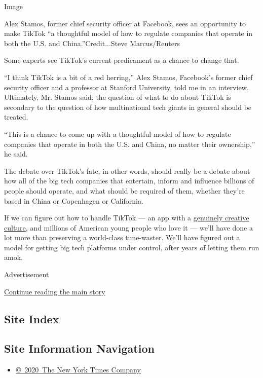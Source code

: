 Image

Alex Stamos, former chief security officer at Facebook, sees an
opportunity to make TikTok ``a thoughtful model of how to regulate
companies that operate in both the U.S. and China.''Credit...Steve
Marcus/Reuters

Some experts see TikTok's current predicament as a chance to change
that.

``I think TikTok is a bit of a red herring,'' Alex Stamos, Facebook's
former chief security officer and a professor at Stanford University,
told me in an interview. Ultimately, Mr. Stamos said, the question of
what to do about TikTok is secondary to the question of how
multinational tech giants in general should be treated.

``This is a chance to come up with a thoughtful model of how to regulate
companies that operate in both the U.S. and China, no matter their
ownership,'' he said.

The debate over TikTok's fate, in other words, should really be a debate
about how all of the big tech companies that entertain, inform and
influence billions of people should operate, and what should be required
of them, whether they're based in China or Copenhagen or California.

If we can figure out how to handle TikTok --- an app with a
\href{https://www.nytimes.com/2020/07/10/style/tiktok-ban-us-users-influencers-taylor-lorenz.html}{genuinely
creative culture}, and millions of American young people who love it ---
we'll have done a lot more than preserving a world-class time-waster.
We'll have figured out a model for getting big tech platforms under
control, after years of letting them run amok.

Advertisement

\protect\hyperlink{after-bottom}{Continue reading the main story}

\hypertarget{site-index}{%
\subsection{Site Index}\label{site-index}}

\hypertarget{site-information-navigation}{%
\subsection{Site Information
Navigation}\label{site-information-navigation}}

\begin{itemize}
\tightlist
\item
  \href{https://help.nytimes.com/hc/en-us/articles/115014792127-Copyright-notice}{©~2020~The
  New York Times Company}
\end{itemize}

